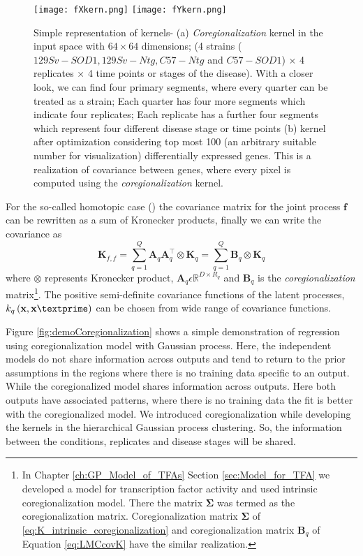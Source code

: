 \begin{figure}
 \begin{center}
  \texttt{[image: fXkern.png]}
  \texttt{[image: fYkern.png]}
  \caption [Simple representation of kernels- coregionalization kernel and kernel after optimization] {Simple representation of kernels- (a) \emph{Coregionalization} kernel in the input space  with $64\times64$ dimensions; (4 strains ($129Sv-SOD1, 129Sv-Ntg, C57-Ntg$ and $C57-SOD1$) $\times$ 4 replicates $\times$ 4 time points or stages of the disease). With a closer look, we can find four primary segments, where every quarter can be treated as a strain; Each quarter has four more segments which indicate four replicates; Each replicate has a further four segments which represent four different disease stage or time points (b) kernel after optimization considering top most 100 (an arbitrary suitable number for visualization) differentially expressed genes. This is a realization of covariance between genes, where every pixel is computed using the \emph{coregionalization} kernel.
  \label{fig:kernel}}
 \end{center}
\end{figure}

For the so-called homotopic case (\cite{Alvarez:2011, Wackernagel:2003}) the covariance matrix for the joint process $\textbf{f}$ can be rewritten as a sum of Kronecker products, finally we can write the covariance as
\begin{equation} \label{eq:LMCcovK}
\textbf{K}_{f,f}=\sum\limits_{q=1}^Q \textbf{A}_q\textbf{A}^{\top}_q \otimes \textbf{K}_q
=\sum\limits_{q=1}^Q \textbf{B}_q \otimes \textbf{K}_q
\end{equation}
where $\otimes$ represents Kronecker product, $\textbf{A}_q \epsilon \mathbb{R}^{D\times R_q}$ and $\textbf{B}_q$ is the \emph{coregionalization} matrix\footnote{In Chapter \ref{ch:GP_Model_of_TFAs} Section \ref{sec:Model_for_TFA} we developed a model for transcription factor activity and used intrinsic coregionalization model. There the matrix $\boldsymbol{\Sigma}$ was termed as the coregionalization matrix. Coregionalization matrix $\boldsymbol{\Sigma}$ of \ref{eq:K_intrinsic_coregionalization} and coregionalization matrix $\textbf{B}_q$ of Equation \ref{eq:LMCcovK} have the similar realization.}. The positive semi-definite covariance functions of the latent processes, $k_q\left(\textbf{x},\textbf{x}\textprime\right)$ can be chosen from wide range of covariance functions. 

Figure \ref{fig:demoCoregionalization} shows a simple demonstration of regression using coregionalization model with Gaussian process. Here, the independent models do not share information across outputs and tend to return to the prior assumptions in the regions where there is no training data specific to an output. While the coregionalized model shares information across outputs. Here both outputs have associated patterns, where there is no training data the fit is better with the coregionalized model. We introduced coregionalization while developing the kernels in the hierarchical Gaussian process clustering. So, the information between the conditions, replicates and disease stages will be shared. 

